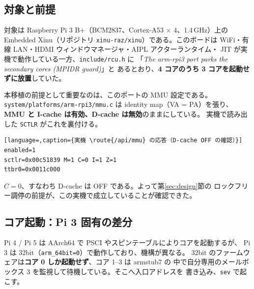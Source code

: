 %

\subsection{対象と前提}

対象は Raspberry Pi 3 B+（BCM2837、Cortex-A53 $\times$ 4、1.4\,GHz）上の
Embedded Xinu（リポジトリ \texttt{xinu-raz/xinu}）である。このボードは
WiFi・有線 LAN・HDMI ウィンドウマネージャ・AIPL アクターランタイム・
JIT が実機で動作している一方、\texttt{include/rcu.h} に
「\textit{The arm-rpi3 port parks the secondary cores (MPIDR guard)}」と
あるとおり、\textbf{4 コアのうち 3 コアを起動せずに放置}していた。

本移植の前提として重要なのは、このポートの MMU 設定である。
\texttt{system/platforms/arm-rpi3/mmu.c} は identity map（VA = PA）を張り、
\textbf{MMU と I-cache は有効、D-cache は無効}のままにしている。
実機で読み出した \texttt{SCTLR} がこれを裏付ける。

\begin{lstlisting}[language=,caption={実機 \route{/api/mmu} の応答（D-cache OFF の確認）}]
enabled=1
sctlr=0x00c51839 M=1 C=0 I=1 Z=1
ttbr0=0x0011c000
\end{lstlisting}

\noindent
$C = 0$、すなわち D-cache は OFF である。よって第\ref{sec:design}節の
ロックフリー調停の前提が、この実機で成立していることが確認できた。

\subsection{コア起動：Pi 3 固有の差分}
\label{sec:rpi3-bringup}

Pi 4 / Pi 5 は AArch64 で PSCI やスピンテーブルによりコアを起動するが、
Pi 3 は 32bit（\texttt{arm\_64bit=0}）で動作しており、機構が異なる。
32bit のファームウェアは\textbf{コア 0 しか起動せず}、コア 1--3 は armstub7 の
中で自分専用のメールボックス 3 を監視して待機している。そこへ入口アドレスを
書き込み、\texttt{sev} で起こす。

